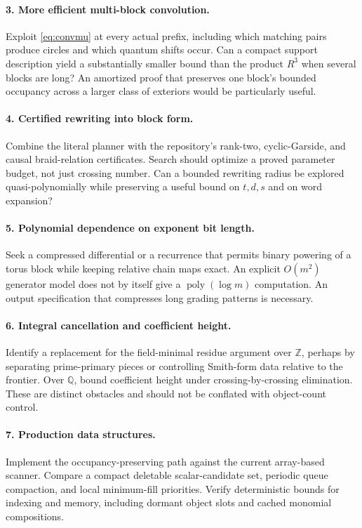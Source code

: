 \documentclass[11pt,letterpaper]{article}
\theoremstyle{remark}\newtheorem{remark}[theorem]{Remark}
\newcommand{\poly}{\operatorname{poly}}
\begin{document}
\paragraph{3. More efficient multi-block convolution.}
Exploit \eqref{eq:convmu} at every actual prefix, including which matching pairs produce circles and which quantum shifts occur. Can a compact support description yield a substantially smaller bound than the product $R^3$ when several blocks are long? An amortized proof that preserves one block's bounded occupancy across a larger class of exteriors would be particularly useful.

\paragraph{4. Certified rewriting into block form.}
Combine the literal planner with the repository's rank-two, cyclic-Garside, and causal braid-relation certificates. Search should optimize a proved parameter budget, not just crossing number. Can a bounded rewriting radius be explored quasi-polynomially while preserving a useful bound on $t,d,s$ and on word expansion?

\paragraph{5. Polynomial dependence on exponent bit length.}
Seek a compressed differential or a recurrence that permits binary powering of a torus block while keeping relative chain maps exact. An explicit $O(m^2)$ generator model does not by itself give a $\poly(\log m)$ computation. An output specification that compresses long grading patterns is necessary.

\paragraph{6. Integral cancellation and coefficient height.}
Identify a replacement for the field-minimal residue argument over $\mathbb Z$, perhaps by separating prime-primary pieces or controlling Smith-form data relative to the frontier. Over $\mathbb Q$, bound coefficient height under crossing-by-crossing elimination. These are distinct obstacles and should not be conflated with object-count control.

\paragraph{7. Production data structures.}
Implement the occupancy-preserving path against the current array-based scanner. Compare a compact deletable scalar-candidate set, periodic queue compaction, and local minimum-fill priorities. Verify deterministic bounds for indexing and memory, including dormant object slots and cached monomial compositions.
\end{document}
